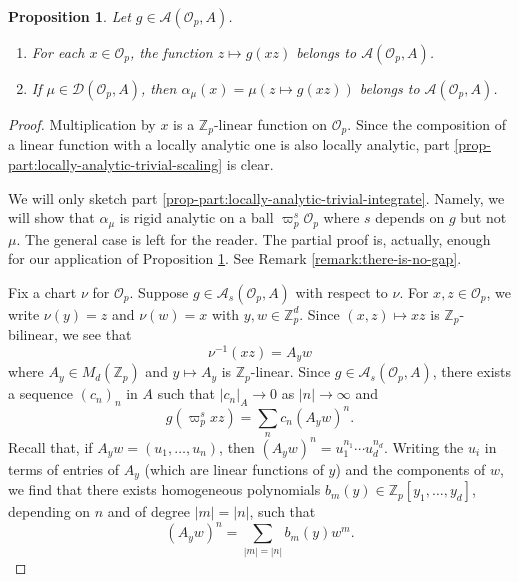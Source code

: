 \documentclass[10pt, twoside]{amsart}
\theoremstyle{plain}
\newtheorem{proposition}[theorem]{Proposition}
\theoremstyle{definition}
\theoremstyle{remark}
\numberwithin{equation}{subsection}
\def\Z{\mathbb Z}
\def\scro{\mathscr O}
\def\scra{\mathscr A}
\def\scrd{\mathscr D}
\def\scro{\mathscr O}
\begin{document}
\begin{proposition}\label{prop:locally-analytic-trivial}
Let $g \in \scra(\scro_p,A)$. 
\begin{enumerate}[label=(\roman*)]
\item\label{prop-part:locally-analytic-trivial-scaling} For each $x \in \scro_p$, the function $z \mapsto g(xz)$ belongs to $\scra(\scro_p,A)$.
\item\label{prop-part:locally-analytic-trivial-integrate} If $\mu \in \scrd(\scro_p,A)$, then $\alpha_\mu(x) = \mu(z \mapsto g(xz))$ belongs to $\scra(\scro_p,A)$.
\end{enumerate}
\end{proposition}
\begin{proof}
Multiplication by $x$ is a $\Z_p$-linear function on $\scro_p$. Since the composition of a linear function with a locally analytic one is also locally analytic, part \ref{prop-part:locally-analytic-trivial-scaling} is clear.

We will only sketch part  \ref{prop-part:locally-analytic-trivial-integrate}. Namely, we will show that $\alpha_\mu$ is rigid analytic on a ball $\varpi_p^s \scro_p$ where $s$ depends on $g$ but not $\mu$. The general case is left for the reader. The partial proof is, actually, enough for our application of Proposition \ref{prop:locally-analytic-trivial}. See Remark \ref{remark:there-is-no-gap}.

Fix a chart $\nu$ for $\scro_p$. Suppose $g \in \scra_s(\scro_p,A)$ with respect to $\nu$. For $x,z \in \scro_p$, we write $\nu(y) = z$ and $\nu(w) = x$ with $y,w \in \Z_p^d$. Since $(x,z) \mapsto xz$ is $\Z_p$-bilinear, we see that
$$
\nu^{-1}(xz) = A_y w
$$
where $A_y \in M_d(\Z_p)$ and $y \mapsto A_y$ is $\Z_p$-linear. Since $g \in \scra_s(\scro_p,A)$, there exists a sequence $(c_n)_n$ in $A$ such that $|c_n|_A \rightarrow 0$ as $|n| \rightarrow \infty$ and 
\begin{equation}\label{eqn:to-show-analytic}
g(\varpi_p^s xz) = \sum_n c_n (A_y w)^n.
\end{equation}
Recall that, if $A_y w = (u_1,\dotsc,u_n)$, then $(A_y w)^n = u_1^{n_1}\dotsb u_d^{n_d}$. Writing the $u_i$ in terms of entries of $A_y$ (which are linear functions of $y$) and the components of $w$, we find that there exists homogeneous polynomials $b_m(y) \in \Z_p[y_1,\dotsc,y_d]$, depending on $n$ and of degree $|m| = |n|$, such that 
$$
(A_yw)^n = \sum_{|m| = |n|} b_m(y) w^m.
$$


\end{proof}
\end{document}
